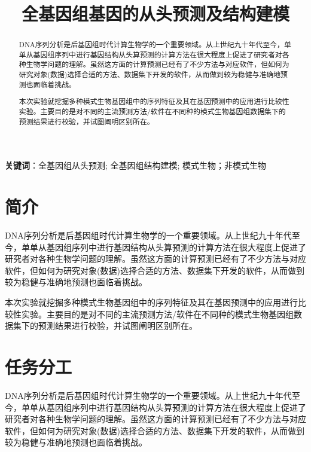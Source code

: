 \documentclass[12pt]{ctexart}
\begin{document}
\title{全基因组基因的从头预测及结构建模}

\maketitle

\begin{abstract}
DNA序列分析是后基因组时代计算生物学的一个重要领域。从上世纪九十年代至今，单单从基因组序列中进行基因结构从头算预测的计算方法在很大程度上促进了研究者对各种生物学问题的理解。虽然这方面的计算预测已经有了不少方法与对应软件，但如何为研究对象(数据)选择合适的方法、数据集下开发的软件，从而做到较为稳健与准确地预测也面临着挑战。

本次实验就挖掘多种模式生物基因组中的序列特征及其在基因预测中的应用进行比较性实验。主要目的是对不同的主流预测方法/软件在不同种的模式生物基因组数据集下的预测结果进行校验，并试图阐明区别所在。
  
  
\end{abstract}
{\footnotesize {\bf 关键词}：全基因组从头预测; 全基因组结构建模; 模式生物；非模式生物}

\newpage

\tableofcontents 

\newpage

\section{简介}

    DNA序列分析是后基因组时代计算生物学的一个重要领域。从上世纪九十年代至今，单单从基因组序列中进行基因结构从头算预测的计算方法在很大程度上促进了研究者对各种生物学问题的理解。虽然这方面的计算预测已经有了不少方法与对应软件，但如何为研究对象(数据)选择合适的方法、数据集下开发的软件，从而做到较为稳健与准确地预测也面临着挑战。

    本次实验就挖掘多种模式生物基因组中的序列特征及其在基因预测中的应用进行比较性实验。主要目的是对不同的主流预测方法/软件在不同种的模式生物基因组数据集下的预测结果进行校验，并试图阐明区别所在。 
\section{任务分工}

   DNA序列分析是后基因组时代计算生物学的一个重要领域。从上世纪九十年代至今，单单从基因组序列中进行基因结构从头算预测的计算方法在很大程度上促进了研究者对各种生物学问题的理解。虽然这方面的计算预测已经有了不少方法与对应软件，但如何为研究对象(数据)选择合适的方法、数据集下开发的软件，从而做到较为稳健与准确地预测也面临着挑战。
   
\end{document}
